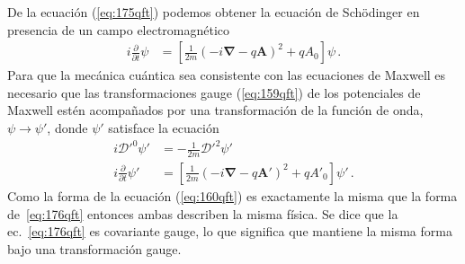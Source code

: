De la ecuación (\ref{eq:175qft}) podemos obtener la ecuación de Schödinger en presencia de un campo electromagnético
\begin{align}
\label{eq:176qft}
 i\frac{\partial}{\partial t}\psi&=\left[\frac{1}{2m}(-i\mathbf{\nabla}-q\mathbf{A})^2+qA_0\right]\psi\,.
\end{align}
 Para que la mecánica cuántica sea consistente con las ecuaciones de Maxwell es necesario que las transformaciones gauge (\ref{eq:159qft}) de los potenciales de Maxwell estén acompañados por una transformación de la función de onda, $\psi\to\psi'$, donde $\psi'$ satisface la ecuación
\begin{align}
  \label{eq:160qft}
   i{\mathcal{D}'}^0\psi'&=-\frac{1}{2m}{\boldsymbol{\mathcal{D}}'}^2\psi'\nonumber\\
 i\frac{\partial}{\partial t}\psi'&=\left[\frac{1}{2m}(-i\mathbf{\nabla}-q\mathbf{A}')^2+q{A'}_0\right]\psi'\,.
\end{align}
Como la forma de la ecuación (\ref{eq:160qft}) es exactamente la misma que la forma de~\eqref{eq:176qft} entonces ambas describen la misma física. Se dice que  la ec.~\eqref{eq:176qft} es covariante gauge, lo que significa que mantiene la misma forma bajo una transformación gauge. 

